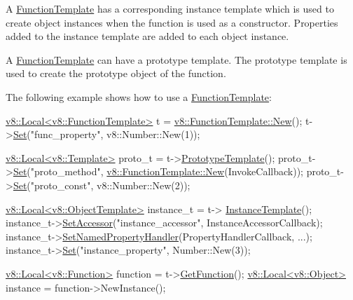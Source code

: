 A \hyperlink{classv8_1_1_function_template}{Function\+Template} has a corresponding instance template which is used to create object instances when the function is used as a constructor. Properties added to the instance template are added to each object instance.

A \hyperlink{classv8_1_1_function_template}{Function\+Template} can have a prototype template. The prototype template is used to create the prototype object of the function.

The following example shows how to use a \hyperlink{classv8_1_1_function_template}{Function\+Template}\+:


\begin{DoxyCode}
\hyperlink{classv8_1_1_local}{v8::Local<v8::FunctionTemplate>} t = 
      \hyperlink{classv8_1_1_function_template_af9012aee4a102c4018fec8e9532cb996}{v8::FunctionTemplate::New}();
t->\hyperlink{classv8_1_1_template_a8a29557db5d0bc980752084b925a9b01}{Set}(\textcolor{stringliteral}{"func\_property"}, v8::Number::New(1));

\hyperlink{classv8_1_1_local}{v8::Local<v8::Template>} proto\_t = t->\hyperlink{classv8_1_1_function_template_aa2bcc2652b5f0fdbc666d943ccf72021}{PrototypeTemplate}();
proto\_t->\hyperlink{classv8_1_1_template_a8a29557db5d0bc980752084b925a9b01}{Set}(\textcolor{stringliteral}{"proto\_method"}, \hyperlink{classv8_1_1_function_template_af9012aee4a102c4018fec8e9532cb996}{v8::FunctionTemplate::New}(InvokeCallback));
proto\_t->\hyperlink{classv8_1_1_template_a8a29557db5d0bc980752084b925a9b01}{Set}(\textcolor{stringliteral}{"proto\_const"}, v8::Number::New(2));

\hyperlink{classv8_1_1_local}{v8::Local<v8::ObjectTemplate>} instance\_t = t->
      \hyperlink{classv8_1_1_function_template_a00dd9725566908e8fd14064542f5a781}{InstanceTemplate}();
instance\_t->\hyperlink{classv8_1_1_object_template_a912ade2f7db7c7e30b606d10012c2bac}{SetAccessor}(\textcolor{stringliteral}{"instance\_accessor"}, InstanceAccessorCallback);
instance\_t->\hyperlink{classv8_1_1_object_template_aa80e9db593d8b954c4153082dc7a439d}{SetNamedPropertyHandler}(PropertyHandlerCallback, ...);
instance\_t->\hyperlink{classv8_1_1_template_a8a29557db5d0bc980752084b925a9b01}{Set}(\textcolor{stringliteral}{"instance\_property"}, Number::New(3));

\hyperlink{classv8_1_1_local}{v8::Local<v8::Function>} \textcolor{keyword}{function} = t->\hyperlink{classv8_1_1_function_template_a3b8e5e214b2ee34c36138961ebac696a}{GetFunction}();
\hyperlink{classv8_1_1_local}{v8::Local<v8::Object>} instance = \textcolor{keyword}{function}->NewInstance();
\end{DoxyCode}


